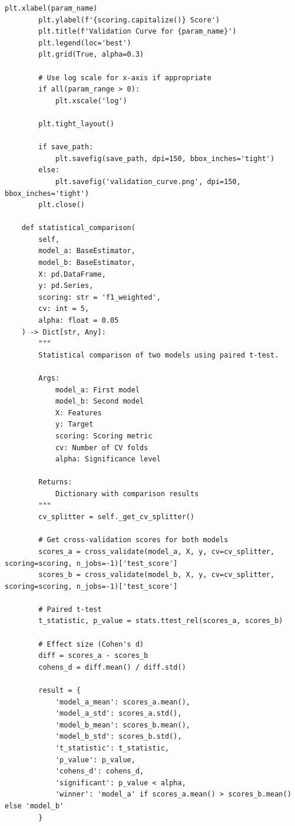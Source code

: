 \begin{lstlisting}[style=python, caption={Production Model Validation Framework}]
        plt.xlabel(param_name)
        plt.ylabel(f'{scoring.capitalize()} Score')
        plt.title(f'Validation Curve for {param_name}')
        plt.legend(loc='best')
        plt.grid(True, alpha=0.3)

        # Use log scale for x-axis if appropriate
        if all(param_range > 0):
            plt.xscale('log')

        plt.tight_layout()

        if save_path:
            plt.savefig(save_path, dpi=150, bbox_inches='tight')
        else:
            plt.savefig('validation_curve.png', dpi=150, bbox_inches='tight')
        plt.close()

    def statistical_comparison(
        self,
        model_a: BaseEstimator,
        model_b: BaseEstimator,
        X: pd.DataFrame,
        y: pd.Series,
        scoring: str = 'f1_weighted',
        cv: int = 5,
        alpha: float = 0.05
    ) -> Dict[str, Any]:
        """
        Statistical comparison of two models using paired t-test.

        Args:
            model_a: First model
            model_b: Second model
            X: Features
            y: Target
            scoring: Scoring metric
            cv: Number of CV folds
            alpha: Significance level

        Returns:
            Dictionary with comparison results
        """
        cv_splitter = self._get_cv_splitter()

        # Get cross-validation scores for both models
        scores_a = cross_validate(model_a, X, y, cv=cv_splitter, scoring=scoring, n_jobs=-1)['test_score']
        scores_b = cross_validate(model_b, X, y, cv=cv_splitter, scoring=scoring, n_jobs=-1)['test_score']

        # Paired t-test
        t_statistic, p_value = stats.ttest_rel(scores_a, scores_b)

        # Effect size (Cohen's d)
        diff = scores_a - scores_b
        cohens_d = diff.mean() / diff.std()

        result = {
            'model_a_mean': scores_a.mean(),
            'model_a_std': scores_a.std(),
            'model_b_mean': scores_b.mean(),
            'model_b_std': scores_b.std(),
            't_statistic': t_statistic,
            'p_value': p_value,
            'cohens_d': cohens_d,
            'significant': p_value < alpha,
            'winner': 'model_a' if scores_a.mean() > scores_b.mean() else 'model_b'
        }


\end{lstlisting}
